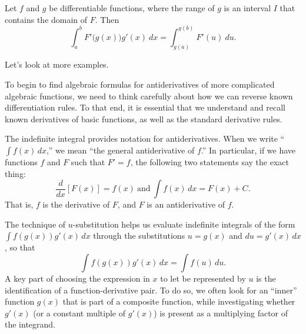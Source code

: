 {Let $f$ and $g$ be differentiable functions, where the range of $g$ is an interval $I$ that contains the domain of $F$. Then 
\[ \int_a^b F'\big(g(x)\big)g'(x)\ dx = \int_{g(a)}^{g(b)} F'(u)\ du. \]
} %

Let's look at more examples.




\begin{summary}
\item To begin to find algebraic formulas for antiderivatives of more complicated algebraic functions, we need to think carefully about how we can reverse known differentiation rules.  To that end, it is essential that we understand and recall known derivatives of basic functions, as well as the standard derivative rules.

\item The indefinite integral provides notation for antiderivatives.  When we write ``$\int f(x) \, dx$,'' we mean ``the general antiderivative of $f$.''  In particular, if we have functions $f$ and $F$ such that $F' = f$, the following two statements say the exact thing:
\[ \frac{d}{dx}[F(x)] = f(x) \ \mbox{and} \ \int f(x) \, dx = F(x) + C. \]
That is, $f$ is the derivative of $F$, and $F$ is an antiderivative of $f$.

\item The technique of $u$-substitution helps us evaluate indefinite integrals of the form $\int f(g(x))g'(x) \, dx$ through the substitutions $u = g(x)$ and $du = g'(x) \, dx$, so that
\[ \int f(g(x))g'(x) \, dx = \int f(u) \, du. \]
A key part of choosing the expression in $x$ to let be represented by $u$ is the identification of a function-derivative pair.  To do so, we often look for an ``inner'' function $g(x)$ that is part of a composite function, while investigating whether $g'(x)$ (or a constant multiple of $g'(x)$) is present as a multiplying factor of the integrand.
\end{summary}

% 

\cleardoublepage